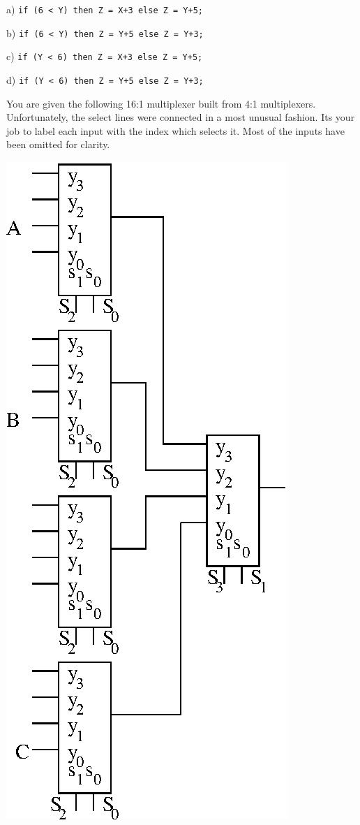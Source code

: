 \documentclass{article}
\begin{document}
\begin{enumerate}
\begin{description}
\item{a) } \verb^if (6 < Y) then Z = X+3 else Z = Y+5;^
\item{b) } \verb^if (6 < Y) then Z = Y+5 else Z = Y+3;^
\item{c) } \verb^if (Y < 6) then Z = X+3 else Z = Y+5;^
\item{d) } \verb^if (Y < 6) then Z = Y+5 else Z = Y+3;^
\end{description}

\pagebreak
You are given the following 16:1 multiplexer built from 4:1 multiplexers.
Unfortunately, the select lines were connected in a
most unusual fashion.  Its your job to label each input with the
index which selects it.  Most of the inputs have been omitted
for clarity.

\includegraphics{./Fig2/OddMux}


\end{enumerate}
\end{document}
